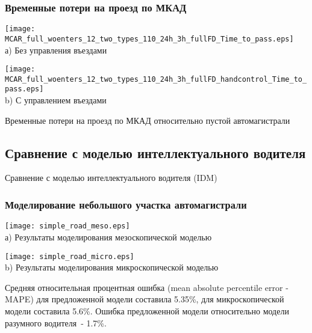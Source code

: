 \begin{frame}
    \frametitle{Временные потери на проезд по МКАД}
    \centering
    \begin{minipage}[b]{.49\textwidth}
        \centering
        \texttt{[image: MCAR\_full\_woenters\_12\_two\_types\_110\_24h\_3h\_fullFD\_Time\_to\_pass.eps]}  \\ а) Без управления въездами
    \end{minipage}
    \hfill
    \begin{minipage}[b]{.49\textwidth}
        \centering
        \texttt{[image: MCAR\_full\_woenters\_12\_two\_types\_110\_24h\_3h\_fullFD\_handcontrol\_Time\_to\_pass.eps]}  \\ b) С управлением въездами
    \end{minipage}
    \hfill
    Временные потери на проезд по МКАД относительно пустой автомагистрали
\end{frame}

\subsection{Сравнение с моделью интеллектуального водителя}
\begin{frame}
    \begin{center}
        \Huge
        Сравнение с моделью интеллектуального водителя (IDM)
    \end{center}
\end{frame}


\begin{frame}
    \frametitle{Моделирование небольшого участка автомагистрали}
    \centering
    \begin{minipage}[b]{0.49\textwidth}
        \centering
        \texttt{[image: simple\_road\_meso.eps]}  \\ а) Результаты моделирования мезоскопической моделью
    \end{minipage}
    \hfill
    \begin{minipage}[b]{0.49\textwidth}
        \centering
        \texttt{[image: simple\_road\_micro.eps]}  \\ b) Результаты моделирования микроскопической моделью
    \end{minipage}
    \hfill
    Средняя относительная процентная ошибка (mean absolute percentile error - MAPE) для предложенной модели составила 5.35\%, для микроскопической модели составила 5.6\%.
    Ошибка предложенной модели относительно модели разумного водителя~- 1.7\%.
\end{frame}

